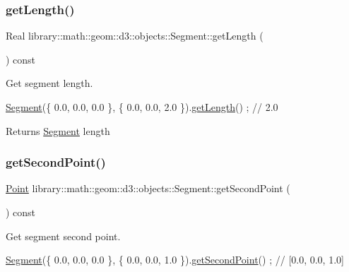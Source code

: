 \subsubsection{\texorpdfstring{get\+Length()}{getLength()}}
{\footnotesize\ttfamily Real library\+::math\+::geom\+::d3\+::objects\+::\+Segment\+::get\+Length (\begin{DoxyParamCaption}{ }\end{DoxyParamCaption}) const}



Get segment length. 


\begin{DoxyCode}
\hyperlink{classlibrary_1_1math_1_1geom_1_1d3_1_1objects_1_1_segment_a5562342d1edf2f52e37ce1bc138ee7d7}{Segment}(\{ 0.0, 0.0, 0.0 \}, \{ 0.0, 0.0, 2.0 \}).\hyperlink{classlibrary_1_1math_1_1geom_1_1d3_1_1objects_1_1_segment_a16b011c680e3102b8b44e6c88ffff81d}{getLength}() ; \textcolor{comment}{// 2.0}
\end{DoxyCode}


\begin{DoxyReturn}{Returns}
\hyperlink{classlibrary_1_1math_1_1geom_1_1d3_1_1objects_1_1_segment}{Segment} length 
\end{DoxyReturn}
\mbox{\label{classlibrary_1_1math_1_1geom_1_1d3_1_1objects_1_1_segment_a5d824fed334185975226d8f7e8489ced}} 
\subsubsection{\texorpdfstring{get\+Second\+Point()}{getSecondPoint()}}
{\footnotesize\ttfamily \hyperlink{classlibrary_1_1math_1_1geom_1_1d3_1_1objects_1_1_point}{Point} library\+::math\+::geom\+::d3\+::objects\+::\+Segment\+::get\+Second\+Point (\begin{DoxyParamCaption}{ }\end{DoxyParamCaption}) const}



Get segment second point. 


\begin{DoxyCode}
\hyperlink{classlibrary_1_1math_1_1geom_1_1d3_1_1objects_1_1_segment_a5562342d1edf2f52e37ce1bc138ee7d7}{Segment}(\{ 0.0, 0.0, 0.0 \}, \{ 0.0, 0.0, 1.0 \}).\hyperlink{classlibrary_1_1math_1_1geom_1_1d3_1_1objects_1_1_segment_a5d824fed334185975226d8f7e8489ced}{getSecondPoint}() ; \textcolor{comment}{// [0.0, 0.0, 1.0]}
\end{DoxyCode}


